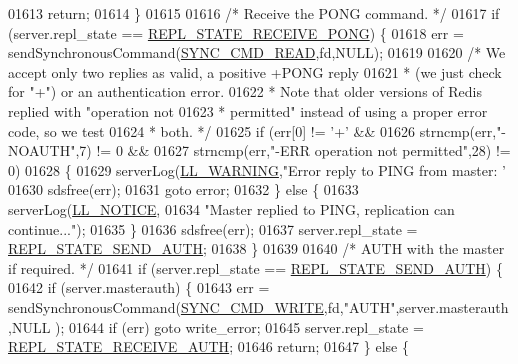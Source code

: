 \begin{DoxyCode}
{{{{{{{{{{{{{{{{{{{{{{{{{{{{{{{{{{{{{{{{{{{{{{{{{{{{{{{{{{{01613         \textcolor{keywordflow}{return};
01614     \}
01615 
01616     \textcolor{comment}{/* Receive the PONG command. */}
01617     \textcolor{keywordflow}{if} (server.repl\_state == \hyperlink{server_8h_a61922e0fcf35df9722d2648484d23ff2}{REPL\_STATE\_RECEIVE\_PONG}) \{
01618         err = sendSynchronousCommand(\hyperlink{replication_8c_a5dde0948d622fc1b0327b0d49cb3cef5}{SYNC\_CMD\_READ},fd,NULL);
01619 
01620         \textcolor{comment}{/* We accept only two replies as valid, a positive +PONG reply}
01621 \textcolor{comment}{         * (we just check for "+") or an authentication error.}
01622 \textcolor{comment}{         * Note that older versions of Redis replied with "operation not}
01623 \textcolor{comment}{         * permitted" instead of using a proper error code, so we test}
01624 \textcolor{comment}{         * both. */}
01625         \textcolor{keywordflow}{if} (err[0] != \textcolor{stringliteral}{'+'} &&
01626             strncmp(err,\textcolor{stringliteral}{"-NOAUTH"},7) != 0 &&
01627             strncmp(err,\textcolor{stringliteral}{"-ERR operation not permitted"},28) != 0)
01628         \{
01629             serverLog(\hyperlink{server_8h_a31229b9334bba7d6be2a72970967a14b}{LL\_WARNING},\textcolor{stringliteral}{"Error reply to PING from master: '%
01630             sdsfree(err);
01631             \textcolor{keywordflow}{goto} error;
01632         \} \textcolor{keywordflow}{else} \{
01633             serverLog(\hyperlink{server_8h_a8c54c191e436c7dd3012167212692401}{LL\_NOTICE},
01634                 \textcolor{stringliteral}{"Master replied to PING, replication can continue..."});
01635         \}
01636         sdsfree(err);
01637         server.repl\_state = \hyperlink{server_8h_aec2fc2703ecb4784a64eedb760136a3f}{REPL\_STATE\_SEND\_AUTH};
01638     \}
01639 
01640     \textcolor{comment}{/* AUTH with the master if required. */}
01641     \textcolor{keywordflow}{if} (server.repl\_state == \hyperlink{server_8h_aec2fc2703ecb4784a64eedb760136a3f}{REPL\_STATE\_SEND\_AUTH}) \{
01642         \textcolor{keywordflow}{if} (server.masterauth) \{
01643             err = sendSynchronousCommand(\hyperlink{replication_8c_aa4480c458f209657b59d476157d44aab}{SYNC\_CMD\_WRITE},fd,\textcolor{stringliteral}{"AUTH"},server.masterauth,NULL
      );
01644             \textcolor{keywordflow}{if} (err) \textcolor{keywordflow}{goto} write\_error;
01645             server.repl\_state = \hyperlink{server_8h_a927236ee88a2420450021c4ab3d0e0d3}{REPL\_STATE\_RECEIVE\_AUTH};
01646             \textcolor{keywordflow}{return};
01647         \} \textcolor{keywordflow}{else} \{
}}}}}}}}}}}}}}}}}}}}}}}}}}}}}}}}}}}}}}}}}}}}}}}}}}}}}}}}}}}}
\end{DoxyCode}
